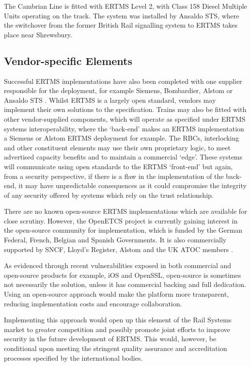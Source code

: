 \documentclass[twoside,11pt,a4paper]{article}
\begin{document}
The Cambrian Line is fitted with ERTMS Level 2, with Class 158 Diesel Multiple Units operating on the track. The system was installed by Ansaldo STS, where the switchover from the former British Rail signalling system to ERTMS takes place near Shrewsbury.

\subsection{Vendor-specific Elements}
Successful ERTMS implementations have also been completed with one supplier responsible for the deployment, for example Siemens, Bombardier, Alstom or Ansaldo STS \citep{UNIFE15a}. Whilst ERTMS is a largely open standard, vendors may implement their own solutions to the specification. Trains may also be fitted with other vendor-supplied components, which will operate as specified under ERTMS systems interoperability, where the `back-end' makes an ERTMS implementation a Siemens or Alstom ERTMS deployment for example. The RBCs, interlocking and other constituent elements may use their own proprietary logic, to meet advertised capacity benefits and to maintain a commercial `edge'. These systems will communicate using open standards to the ERTMS `front-end' but again, from a security perspective, if there is a flaw in the implementation of the back-end, it may have unpredictable consequences as it could compromise the integrity of any security offered by systems which rely on the trust relationship.

There are no known open-source ERTMS implementations which are available for close scrutiny. However, the OpenETCS project is currently gaining interest in the open-source community for implementation, which is funded by the German Federal, French, Belgian and Spanish Governments. It is also commercially supported by SNCF, Lloyd's Register, Alstom and the UK ATOC members \citep{openETCS15a}.

As evidenced through recent vulnerabilities exposed in both commercial and open-source products for example, iOS and OpenSSL, open-source is sometimes not necessarily the solution, unless it has commercial backing and full dedication. Using an open-source approach would make the platform more transparent, reducing implementation costs and encourage collaboration.

Implementing this approach would open up this element of the Rail Systems market to greater competition and possibly promote joint efforts to improve security in the future development of ERTMS. This would, however, be conditional upon meeting the stringent quality assurance and accreditation processes specified by the international bodies.
\end{document}

